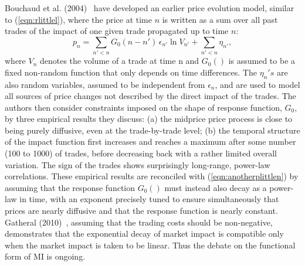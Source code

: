 Bouchaud et al. (2004)~\cite{bouchaud2004} have developed an earlier price evolution model, similar to (\ref{eqn:rlittlel}), where the price at time $n$ is written as a sum over all past trades of the impact of one given trade propagated up to time $n$:
	\begin{equation}\label{eqn:anotherplittlen}
	p_n = \sum_{n'<n} G_0(n-n')\,\epsilon_{n'} \ln{V_{n'}} + \sum_{n'<n} \eta_{n'},
	\end{equation}
where $V_n$ denotes the volume of a trade at time n and $G_0()$ is assumed to be a fixed non-random function that only depends on time differences. The $\eta_n's$ are also random variables, assumed to be independent from $\epsilon_n$, and are used to model all sources of price changes not described by the direct impact of the trades. The authors then consider constraints imposed on the shape of response function, $G_0$, by three empirical results they discuss: (a) the midprice price process is close to being purely diffusive, even at the trade-by-trade level; (b) the temporal structure of the impact function first increases and reaches a maximum after some number (100 to 1000) of trades, before decreasing back with a rather limited overall variation. The sign of the trades shows surprisingly long-range, power-law correlations. These empirical results are reconciled with (\ref{eqn:anotherplittlen}) by assuming that the response function $G_0()$ must instead also decay as a power-law in time, with an exponent precisely tuned to ensure simultaneously that prices are nearly diffusive and that the response function is nearly constant. Gatheral (2010)~\cite{gatheral}, assuming that the trading costs should be non-negative, demonstrates that the exponential decay of market impact is compatible only when the market impact is taken to be linear. Thus the debate on the functional form of MI is ongoing. 


